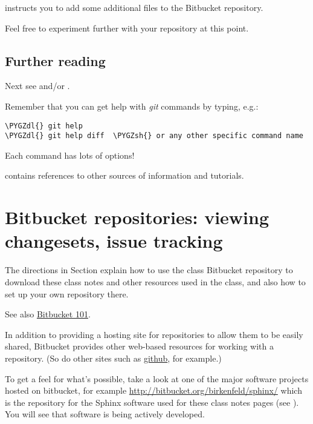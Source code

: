 \documentclass[letterpaper,10pt,english]{sphinxmanual}
\def\PYGZsh{\char`\#}
\def\PYGZdl{\char`\$}
\begin{document}
 instructs you to add some additional files to the Bitbucket
repository.

Feel free to experiment further with your repository at this point.


\subsection{Further reading}
\label{git:further-reading}
Next see {\hyperref[bitbucket:bitbucket]{}} and/or {\hyperref[git_more:git\string-more]{}}.

Remember that you can get help with \emph{git} commands by typing, e.g.:

\begin{Verbatim}[commandchars=\\\{\}]
\PYGZdl{} git help
\PYGZdl{} git help diff  \PYGZsh{} or any other specific command name
\end{Verbatim}

Each command has lots of options!

{\hyperref[biblio:biblio\string-git]{}} contains references to other sources of information and
tutorials.


\section{Bitbucket repositories: viewing changesets, issue tracking}
\label{bitbucket:bitbucket-repositories-viewing-changesets-issue-tracking}\label{bitbucket:bitbucket}\label{bitbucket::doc}
The directions in Section {\hyperref[git:git]{}} explain how to use the class Bitbucket
repository to download these class notes and other resources used in the
class, and also how to set up your own repository there.

See also \href{https://confluence.atlassian.com/display/BITBUCKET/Bitbucket+101}{Bitbucket 101}.

In addition to providing a hosting site for repositories to allow them to be
easily shared, Bitbucket provides other web-based resources for working with
a repository.  (So do other sites such as
\href{http://github.com/repositories}{github}, for
example.)

To get a feel for what's possible, take a look at one of the major software
projects hosted on bitbucket, for example
\url{http://bitbucket.org/birkenfeld/sphinx/} which is the repository for the
Sphinx software used for these class notes pages (see {\hyperref[sphinx:sphinx]{}}).  You
will see that software is being actively developed.
\end{document}
